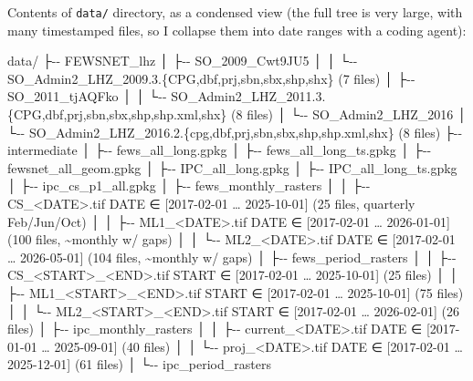 \documentclass[
  a4paper,
]{article}
\newenvironment{Shaded}{\begin{snugshade}}{\end{snugshade}}
\newcommand{\NormalTok}[1]{#1}
\begin{document}
\normalsize

Contents of \texttt{data/} directory, as a condensed view (the full tree
is very large, with many timestamped files, so I collapse them into date
ranges with a coding agent):

\scriptsize

\begin{Shaded}
\begin{Highlighting}[]
\NormalTok{data/}
\NormalTok{├{-}{-} FEWSNET\_lhz}
\NormalTok{│   ├{-}{-} SO\_2009\_Cwt9JU5}
\NormalTok{│   │   └{-}{-} SO\_Admin2\_LHZ\_2009.3.\{CPG,dbf,prj,sbn,sbx,shp,shx\}        (7 files)}
\NormalTok{│   ├{-}{-} SO\_2011\_tjAQFko}
\NormalTok{│   │   └{-}{-} SO\_Admin2\_LHZ\_2011.3.\{CPG,dbf,prj,sbn,sbx,shp,shp.xml,shx\} (8 files)}
\NormalTok{│   └{-}{-} SO\_Admin2\_LHZ\_2016}
\NormalTok{│       └{-}{-} SO\_Admin2\_LHZ\_2016.2.\{cpg,dbf,prj,sbn,sbx,shp,shp.xml,shx\} (8 files)}
\NormalTok{├{-}{-} intermediate}
\NormalTok{│   ├{-}{-} fews\_all\_long.gpkg}
\NormalTok{│   ├{-}{-} fews\_all\_long\_ts.gpkg}
\NormalTok{│   ├{-}{-} fewsnet\_all\_geom.gpkg}
\NormalTok{│   ├{-}{-} IPC\_all\_long.gpkg}
\NormalTok{│   ├{-}{-} IPC\_all\_long\_ts.gpkg}
\NormalTok{│   ├{-}{-} ipc\_cs\_p1\_all.gpkg}
\NormalTok{│   ├{-}{-} fews\_monthly\_rasters}
\NormalTok{│   │   ├{-}{-} CS\_\textless{}DATE\textgreater{}.tif      DATE ∈ [2017{-}02{-}01 … 2025{-}10{-}01]   (25 files, quarterly Feb/Jun/Oct)}
\NormalTok{│   │   ├{-}{-} ML1\_\textless{}DATE\textgreater{}.tif     DATE ∈ [2017{-}02{-}01 … 2026{-}01{-}01]   (100 files, \textasciitilde{}monthly w/ gaps)}
\NormalTok{│   │   └{-}{-} ML2\_\textless{}DATE\textgreater{}.tif     DATE ∈ [2017{-}02{-}01 … 2026{-}05{-}01]   (104 files, \textasciitilde{}monthly w/ gaps)}
\NormalTok{│   ├{-}{-} fews\_period\_rasters}
\NormalTok{│   │   ├{-}{-} CS\_\textless{}START\textgreater{}\_\textless{}END\textgreater{}.tif   START ∈ [2017{-}02{-}01 … 2025{-}10{-}01]   (25 files)}
\NormalTok{│   │   ├{-}{-} ML1\_\textless{}START\textgreater{}\_\textless{}END\textgreater{}.tif  START ∈ [2017{-}02{-}01 … 2025{-}10{-}01]   (75 files)}
\NormalTok{│   │   └{-}{-} ML2\_\textless{}START\textgreater{}\_\textless{}END\textgreater{}.tif  START ∈ [2017{-}02{-}01 … 2026{-}02{-}01]   (26 files)}
\NormalTok{│   ├{-}{-} ipc\_monthly\_rasters}
\NormalTok{│   │   ├{-}{-} current\_\textless{}DATE\textgreater{}.tif  DATE ∈ [2017{-}01{-}01 … 2025{-}09{-}01]   (40 files)}
\NormalTok{│   │   └{-}{-} proj\_\textless{}DATE\textgreater{}.tif     DATE ∈ [2017{-}02{-}01 … 2025{-}12{-}01]   (61 files)}
\NormalTok{│   └{-}{-} ipc\_period\_rasters}

\end{Highlighting}
\end{Shaded}
\end{document}
